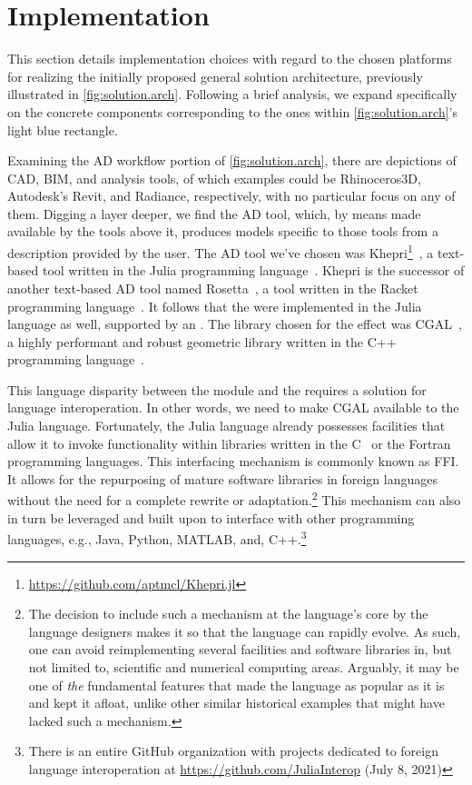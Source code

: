 \section{Implementation}%
\label{sec:solution.impl}

This section details implementation choices with regard to the chosen platforms
for realizing the initially proposed general solution architecture, previously
illustrated in \cref{fig:solution.arch}. Following a brief analysis, we expand
specifically on the concrete components corresponding to the ones within
\cref{fig:solution.arch}'s light blue rectangle.

Examining the \ac{AD} workflow portion of \cref{fig:solution.arch}, there are
depictions of \ac{CAD}, \ac{BIM}, and analysis tools, of which examples could be
Rhinoceros3D, Autodesk's Revit, and Radiance, respectively, with no particular
focus on any of them.  Digging a layer deeper, we find the \ac{AD} tool, which,
by means made available by the tools above it, produces models specific to those
tools from a description provided by the user.  The \ac{AD} tool we've chosen
was
Khepri\footnote{\url{https://github.com/aptmcl/Khepri.jl}}~\cite{Leitao:2019:GRUGEAV},
a text-based tool written in the Julia programming
language~\cite{Bezanson:2017:JAFANC}.  Khepri is the successor of another
text-based \ac{AD} tool named Rosetta~\cite{Leitao:2011:PGDCAD}, a tool written
in the Racket programming language~\cite{PLT:2010:Reference}.  It follows that
the \primitives were implemented in the Julia language as well, supported by an
\geomlibrary.  The library chosen for the effect was
\ac{CGAL}~\cite{CGAL:5.3:Project}, a highly performant and robust geometric
library written in the C++ programming language~\cite{Stroustrup:2013:CPP}.

This language disparity between the \primitives module and the \geomlibrary
requires a solution for language interoperation.  In other words, we need to
make \ac{CGAL} available to the Julia language.  Fortunately, the Julia language
already possesses facilities that allow it to invoke functionality within
libraries written in the C~\cite{Kernighan:1988:C} or the
Fortran~\cite{Backus:1957:Fortran} programming languages.  This interfacing
mechanism is commonly known as \ac{FFI}.  It allows for the repurposing of
mature software libraries in foreign languages without the need for a complete
rewrite or adaptation.\footnote{The decision to include such a mechanism at the
language's core by the language designers makes it so that the language can
rapidly evolve. As such, one can avoid reimplementing several facilities and
software libraries in, but not limited to, scientific and numerical computing
areas.  Arguably, it may be one of \textit{the} fundamental features that made
the language as popular as it is and kept it afloat, unlike other similar
historical examples that might have lacked such a mechanism.}  This mechanism
can also in turn be leveraged and built upon to interface with other programming
languages, e.g., Java, Python, MATLAB, and, C++.\footnote{There is an entire
GitHub organization with projects dedicated to foreign language interoperation
at \url{https://github.com/JuliaInterop} (July 8, 2021)}

